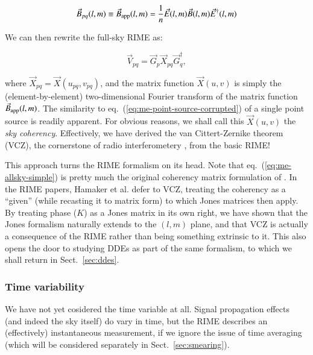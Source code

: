 \documentclass[]{aa}
\begin{document}
  \[
  \vec B_{pq}(l,m) \equiv \vec B_{\rm app}(l,m) =  \frac{1}{n} \vec E(l,m) \vec B(l,m) \vec E^\dagger(l,m)
  \]

We can then rewrite the full-sky RIME as:

\begin{equation}\label{eq:me-allsky-simple}
\vec V_{pq} = \vec G_p \vec X_{pq} \vec G^\dagger_q,
\end{equation}

where $\vec X_{pq} = \vec X(u_{pq},v_{pq})$, and the matrix function $\vec X(u,v)$ is simply the (element-by-element) two-dimensional Fourier transform of the matrix function $\vec B_{\rm app}(l,m)$. The similarity to eq.~(\ref{eq:me-point-source-corrupted}) of a single point source is readily apparent. For obvious reasons, we shall call this $\vec X(u,v)$ the {\em sky coherency}. Effectively, we have derived the van Cittert-Zernike theorem (VCZ), the cornerstone of radio interferometery \citep[Sect.~14.1]{tms}, from the basic RIME! 

This approach turns the RIME formalism on its head. Note that eq.~(\ref{eq:me-allsky-simple}) is pretty much the original coherency matrix formulation of \citet[eq.~2]{ME4}. In the RIME papers, Hamaker et al. defer to VCZ, treating the coherency as a ``given'' (while recasting it to matrix form) to which Jones matrices then apply. By treating phase ($K$) as a Jones matrix in its own right, we have shown that the Jones formalism naturally extends to the $(l,m)$ plane, and that VCZ is actually a consequence of the RIME rather than being something extrinsic to it. This also opens the door to studying DDEs as part of the same formalism, to which we shall return in Sect.~\ref{sec:ddes}.

\subsubsection{Time variability}

We have not yet cosidered the time variable at all. Signal propagation effects (and indeed the sky itself) do vary in time, but the RIME describes an (effectively) instantaneous measurement, if we ignore the issue of time averaging (which will be considered separately in Sect.~\ref{sec:smearing}). 
\end{document}

